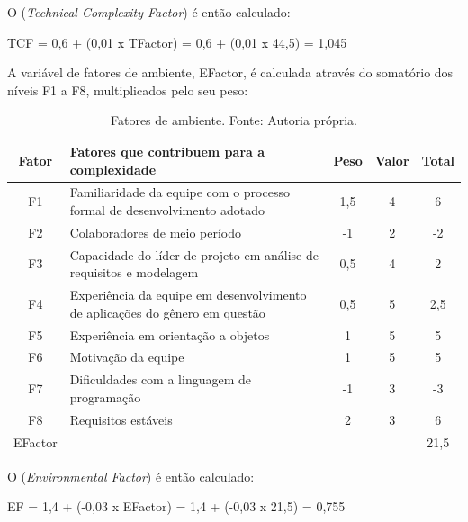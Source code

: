 O  (\textit{Technical Complexity Factor}) é então calculado:

\begin{center}
TCF = 0,6 + (0,01 x TFactor) = 0,6 + (0,01 x 44,5) = 1,045
\end{center}

\newpage

A variável de fatores de ambiente, EFactor, é calculada através do somatório dos níveis F1 a F8, multiplicados pelo seu peso:

\begin{table}[h!]
\caption[Fatores de ambiente]{Fatores de ambiente. Fonte: Autoria própria.}
\begin{center}
\begin{tabular}{|c|m{9cm}|c|c|c|}
\hline
\textbf{Fator} & \textbf{Fatores que contribuem para a complexidade} & \textbf{Peso} & \textbf{Valor}  & \textbf{Total} \\ \hline \hline
F1  & Familiaridade da equipe com o processo formal de desenvolvimento adotado & 1,5 & 4 & 6	\\
\hline
F2  & Colaboradores de meio período & -1 & 2 & -2	\\
\hline
F3  & Capacidade do líder de projeto em análise de requisitos e modelagem & 0,5 & 4 & 2	\\
\hline
F4  & Experiência da equipe em desenvolvimento de aplicações do gênero em questão & 0,5 & 5 & 2,5	\\
\hline
F5  & Experiência em orientação a objetos & 1 & 5 & 5	\\
\hline
F6  & Motivação da equipe & 1 & 5 & 5	\\
\hline
F7  & Dificuldades com a linguagem de programação & -1 & 3 & -3	\\
\hline
F8  & Requisitos estáveis & 2 & 3 & 6	\\
\hline
EFactor & & & & 21,5	\\
\hline
\end{tabular}%
\end{center}
\label{tab:efactor}
\end{table}

O  (\textit{Environmental Factor}) é então calculado:

\begin{center}
EF = 1,4 + (-0,03 x EFactor) = 1,4 + (-0,03 x 21,5) = 0,755
\end{center}

